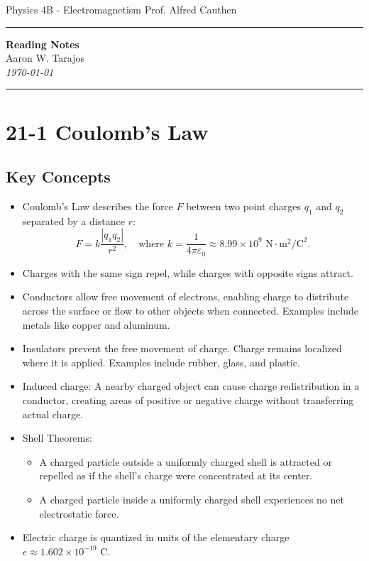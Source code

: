 \documentclass{article}
\begin{document}
\noindent
Physics 4B - Electromagnetism \hfill Prof. Alfred Cauthen

\noindent\rule{\textwidth}{0.4pt}

\begin{center}
    \textbf{\LARGE Reading Notes} \\
    \vspace{12pt}
    \large Aaron W. Tarajos \\
    \textit{\today}
\end{center}

\noindent\rule{\textwidth}{0.4pt}

\section*{21-1 Coulomb's Law}

\subsection*{Key Concepts}
\begin{itemize}
    \item Coulomb's Law describes the force $F$ between two point charges $q_1$ and $q_2$ separated by a distance $r$:
    \[
    F = k \frac{|q_1 q_2|}{r^2}, \quad \text{where } k = \frac{1}{4\pi\varepsilon_0} \approx 8.99 \times 10^9 \text{ N}\cdot\text{m}^2/\text{C}^2.
    \]
    \item Charges with the same sign repel, while charges with opposite signs attract.
    \item Conductors allow free movement of electrons, enabling charge to distribute across the surface or flow to other objects when connected. Examples include metals like copper and aluminum.
    \item Insulators prevent the free movement of charge. Charge remains localized where it is applied. Examples include rubber, glass, and plastic.
    \item Induced charge: A nearby charged object can cause charge redistribution in a conductor, creating areas of positive or negative charge without transferring actual charge.
    \item Shell Theorems:
    \begin{itemize}
        \item A charged particle outside a uniformly charged shell is attracted or repelled as if the shell's charge were concentrated at its center.
        \item A charged particle inside a uniformly charged shell experiences no net electrostatic force.
    \end{itemize}
    \item Electric charge is quantized in units of the elementary charge $e \approx 1.602 \times 10^{-19}$ C.
\end{itemize}
\end{document}
